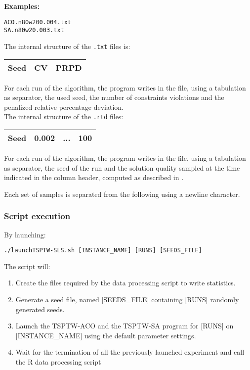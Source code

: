 \documentclass{article}
\begin{document}
					 
\textbf{Examples:} \begin{verbatim}
ACO.n80w200.004.txt
SA.n80w20.003.txt
\end{verbatim}


The internal structure of the \verb|.txt| files is: 
\begin{tabular}{|c|c|c|}
\hline
\textbf{Seed}	&	\textbf{CV} & \textbf{PRPD} \\ \hline
\end{tabular}

For each run of the algorithm, the program writes in the file, using a tabulation as separator, the used seed, the number of constraints violations and the penalized relative percentage deviation. \\

The internal structure of the \verb|.rtd| files: 
\begin{tabular}{|c|c|c|c|}
\hline
\textbf{Seed}	&	\textbf{0.002} & \textbf{...} & \textbf{100}  \\ \hline
\end{tabular}

For each run of the algorithm, the program writes in the file, using a tabulation as separator, the seed of the run and the solution quality sampled at the time indicated in the column header, computed as described in .

Each set of samples is separated from the following using a newline character.


\subsubsection{Script execution}
By launching:
\begin{center}
\begin{verbatim}
./launchTSPTW-SLS.sh [INSTANCE_NAME] [RUNS] [SEEDS_FILE]
\end{verbatim}
\end{center}

The script will:
\begin{enumerate}
  \item Create the files required by the data processing script to write statistics.
  \item Generate a seed file, named [SEEDS\_FILE] containing [RUNS] randomly generated seeds.
  \item Launch the TSPTW-ACO and the TSPTW-SA program for [RUNS] on [INSTANCE\_NAME] using the default parameter settings.
  \item Wait for the termination of all the previously launched experiment and call the R data processing script
\end{enumerate}
\end{document}
